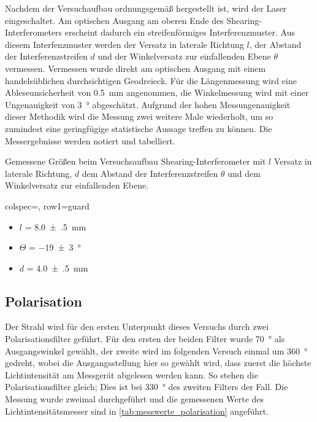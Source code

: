 \documentclass[ngerman]{scrartcl}
\begin{document}
Nachdem der Versuchaufbau ordnungsgemäß hergestellt ist, wird der Laser eingeschaltet. Am optischen Ausgang am oberen Ende des Shearing-Interferometers erscheint dadurch ein streifenförmiges Interferenzmuster. Aus diesem Interfenzmuster werden der Versatz in laterale Richtung $l$, der Abstand der Interferenzstreifen $d$ und der Winkelversatz zur einfallenden Ebene $\theta$ vermessen. Vermessen wurde direkt am optischen Ausgang mit einem handelsüblichen durchsichtigen Geodreieck. Für die Längenmessung wird eine Ableseunsicherheit von \SI{0.5}{mm} angenommen, die Winkelmessung wird mit einer Ungenauigkeit von \SI{3}{\degree} abgeschätzt. Aufgrund der hohen Messungenauigkeit dieser Methodik wird die Messung zwei weitere Male wiederholt, um so zumindest eine geringfügige statistische Aussage treffen zu können. Die Messergebnisse werden notiert und tabelliert.
\begin{table}[H]
    \centering
    \begin{samepage}
        \caption[Messung Shearing]{Gemessene Größen beim Versuchsaufbau Shearing-Interferometer mit $l$ Versatz in laterale Richtung, $d$ dem Abstand der Interferenzstreifen $\theta$ und dem Winkelversatz zur einfallenden Ebene. }
        \label{tab:}
        \begin{tblr}{colspec={}, row{1}={guard}}
        \end{tblr}
    \end{samepage}
\end{table}

\begin{itemize}
    \item $l$ = \SI{8.0(5)}{\milli\meter}
    \item $\Theta$ = \SI{-19(3)}{\degree}
    \item $d$ = \SI{4.0(5)}{\milli\meter}
\end{itemize}





\subsection{Polarisation}
\label{sec:durchfuehrung_polarisation}
Der Strahl wird für den ersten Unterpunkt dieses Versuchs durch zwei Polarisationsfilter geführt. Für den ersten der beiden Filter wurde \SI{70}{\degree} als Ausgangswinkel gewählt, der zweite wird im folgenden Versuch einmal um \SI{360}{\degree} gedreht, wobei die Ausgangsstellung hier so gewählt wird, dass zuerst die höchste Lichtintensität am Messgerät abgelesen werden kann. So stehen die Polarisationsfilter gleich; Dies ist bei \SI{330}{\degree} des zweiten Filters der Fall.
Die Messung wurde zweimal durchgeführt und die gemessenen Werte des Lichtintensitätsmesser sind in \autoref{tab:messwerte_polarisation} angeführt.
\end{document}
